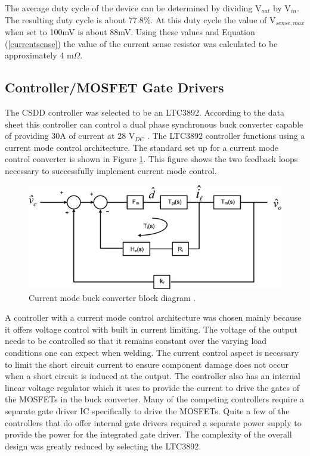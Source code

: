 \documentclass[11pt]{article}
\begin{document}
    \noindent The average duty cycle of the device can be determined by dividing V$_{out}$ by V$_{in}$. The resulting duty cycle is about 77.8$\%$. At this duty cycle the value of V$_{sense,max}$ when set to 100mV is about 88mV. Using these values and Equation (\ref{currentsense}) the value of the current sense resistor was calculated to be approximately 4 m$\Omega$.
    
    \subsection{Controller/MOSFET Gate Drivers}
    
    \noindent The CSDD controller was selected to be an LTC3892. According to the data sheet this controller can control a dual phase synchronous buck converter capable of providing 30A of current at 28 V$_{DC}$ \cite{linear_technology_ltc3892:_nodate}. The LTC3892 controller functions using a current mode control architecture. The standard set up for a current mode control converter is shown in Figure \ref{currentmode}. This figure shows the two feedback loops necessary to successfully implement current mode control.
    
    \begin{figure}[H]
        \centering
        \includegraphics[width=0.5\linewidth]{Block-diagram-of-control-to-output-for-boost-converter-with-peak-current-mode-control.png}
        \caption{Current mode buck converter block diagram \cite{shen_yaur_chen_block_2016}.}
        \label{currentmode}
    \end{figure}
    
    \noindent A controller with a current mode control architecture was chosen mainly because it offers voltage control with built in current limiting. The voltage of the output needs to be controlled so that it remains constant over the varying load conditions one can expect when welding. The current control aspect is necessary to limit the short circuit current to ensure component damage does not occur when a short circuit is induced at the output.
    \newline
    \newline
    \noindent The controller also has an internal linear voltage regulator which it uses to provide the current to drive the gates of the MOSFETs in the buck converter. Many of the competing controllers require a separate gate driver IC specifically to drive the MOSFETs. Quite a few of the controllers that do offer internal gate drivers required a separate power supply to provide the power for the integrated gate driver. The complexity of the overall design was greatly reduced by selecting the LTC3892.
    
\end{document}
